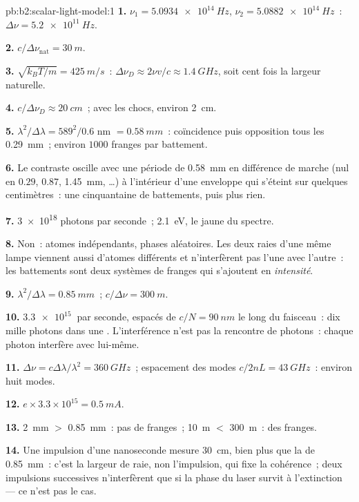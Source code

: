 \begin{solution}{pb:b2:scalar-light-model:1}
\textbf{1.} $\nu_1 = \qty{5.0934e14}{Hz}$, $\nu_2 = \qty{5.0882e14}{Hz}$~: $\Delta\nu = \qty{5.2e11}{Hz}$.

\textbf{2.} $c/\Delta\nu_{\text{nat}} = \qty{30}{m}$.

\textbf{3.} $\sqrt{k_BT/m} = \qty{425}{m/s}$~: $\Delta\nu_D \approx 2\nu v/c \approx \qty{1.4}{GHz}$, soit
cent fois la largeur naturelle.

\textbf{4.} $c/\Delta\nu_D \approx \qty{20}{cm}$~; avec les chocs, environ \qty{2}{cm}.

\textbf{5.} $\lambda^2/\Delta\lambda = 589^2/0.6$ nm $= \qty{0.58}{mm}$~: coïncidence puis
opposition tous les \qty{0.29}{mm}~; environ $1000$ franges par battement.

\textbf{6.} Le contraste oscille avec une période de \qty{0.58}{mm} en différence
de marche (nul en $0.29$, $0.87$, \qty{1.45}{mm}, \dots) à l'intérieur d'une enveloppe
qui s'éteint sur quelques centimètres~: une cinquantaine de battements, puis plus rien.

\textbf{7.} \qty{3e18}{} photons par seconde~; \qty{2.1}{eV}, le jaune du
spectre.

\textbf{8.} Non~: atomes indépendants, phases aléatoires. Les deux raies d'une même
lampe viennent aussi d'atomes différents et n'interfèrent pas l'une avec
l'autre~: les battements sont deux systèmes de franges qui s'ajoutent en \emph{intensité}.

\textbf{9.} $\lambda^2/\Delta\lambda = \qty{0.85}{mm}$~; $c/\Delta\nu = \qty{300}{m}$.

\textbf{10.} $\qty{3.3e15}{}$ par seconde, espacés de $c/N = \qty{90}{nm}$ le long du faisceau~:
dix mille photons dans une . L'interférence n'est pas
la rencontre de photons~: chaque photon interfère avec lui-même.

\textbf{11.} $\Delta\nu = c\Delta\lambda/\lambda^2 = \qty{360}{GHz}$~; espacement des modes $c/2nL = \qty{43}{GHz}$~:
environ huit modes.

\textbf{12.} $e \times 3.3 \times 10^{15} = \qty{0.5}{mA}$.

\textbf{13.} \qty{2}{mm} $>$ \qty{0.85}{mm}~: pas de franges~; \qty{10}{m} $<$ \qty{300}{m}~: des franges.

\textbf{14.} Une impulsion d'une nanoseconde mesure \qty{30}{cm}, bien plus que la
 de \qty{0.85}{mm}~: c'est la largeur de raie, non l'impulsion, qui fixe la
cohérence~; deux impulsions successives n'interfèrent que si la phase du laser
survit à l'extinction --- ce n'est pas le cas.


\end{solution}
